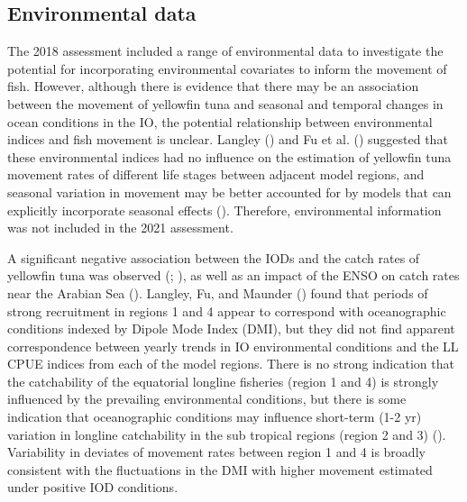 \documentclass[
]{scrartcl}
\begin{document}
\subsection{Environmental data}\label{environmental-data}

The 2018 assessment included a range of environmental data to
investigate the potential for incorporating environmental covariates to
inform the movement of fish. However, although there is evidence that
there may be an association between the movement of yellowfin tuna and
seasonal and temporal changes in ocean conditions in the IO, the
potential relationship between environmental indices and fish movement
is unclear. Langley ()
and Fu et al. ()
suggested that these environmental indices had no influence on the
estimation of yellowfin tuna movement rates of different life stages
between adjacent model regions, and seasonal variation in movement may
be better accounted for by models that can explicitly incorporate
seasonal effects (). Therefore, environmental information was not included in the
2021 assessment.

A significant negative association between the IODs and the catch rates
of yellowfin tuna was observed
(; ), as well as an impact of the ENSO on catch rates near the
Arabian Sea (). Langley, Fu, and Maunder
() found
that periods of strong recruitment in regions 1 and 4 appear to
correspond with oceanographic conditions indexed by Dipole Mode Index
(DMI), but they did not find apparent correspondence between yearly
trends in IO environmental conditions and the LL CPUE indices from each
of the model regions. There is no strong indication that the
catchability of the equatorial longline fisheries (region 1 and 4) is
strongly influenced by the prevailing environmental conditions, but
there is some indication that oceanographic conditions may influence
short-term (1-2 yr) variation in longline catchability in the sub
tropical regions (region 2 and 3)
(). Variability in deviates of movement rates between
region 1 and 4 is broadly consistent with the fluctuations in the DMI
with higher movement estimated under positive IOD conditions.
\end{document}
